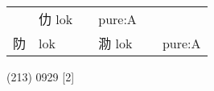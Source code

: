 \documentclass[14pt,a4paper]{scrartcl}
\begin{document}
\begin{longtable}[c]{@{}llllll@{}}
\begin{minipage}[t]{0.14\columnwidth}
\strut\end{minipage} &
\begin{minipage}[t]{0.14\columnwidth}\raggedright\strut
仂 lok
\strut\end{minipage} &
\begin{minipage}[t]{0.14\columnwidth}\raggedright\strut
\strut\end{minipage} &
\begin{minipage}[t]{0.14\columnwidth}\raggedright\strut
pure:A
\strut\end{minipage}\tabularnewline
\begin{minipage}[t]{0.14\columnwidth}\raggedright\strut
阞
\strut\end{minipage} &
\begin{minipage}[t]{0.14\columnwidth}\raggedright\strut
lok
\strut\end{minipage} &
\begin{minipage}[t]{0.14\columnwidth}\raggedright\strut
\strut\end{minipage} &
\begin{minipage}[t]{0.14\columnwidth}\raggedright\strut
泐 lok
\strut\end{minipage} &
\begin{minipage}[t]{0.14\columnwidth}\raggedright\strut
\strut\end{minipage} &
\begin{minipage}[t]{0.14\columnwidth}\raggedright\strut
pure:A
\strut\end{minipage}\tabularnewline
\bottomrule
\end{longtable}

(213) 0929 {[}2{]}
\end{document}
